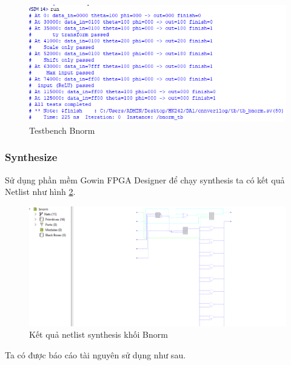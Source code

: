 \begin{figure}[H]
    \centering
    \includegraphics[width=0.75\linewidth]{Images/bnormtst.png}
    \caption{Testbench Bnorm}
    \label{fig:enter-label}
\end{figure}

\subsubsection{Synthesize}
Sử dụng phần mềm Gowin FPGA Designer để chạy synthesis ta có kết quả Netlist như hình \ref{fig:bnormsynth}.
\begin{figure}[H]
    \centering
    \includegraphics[width=0.75\linewidth]{Images/bnsynth.png}
    \caption{Kết quả netlist synthesis khối Bnorm}
    \label{fig:bnormsynth}
\end{figure}
Ta có được báo cáo tài nguyên sử dụng như sau.

